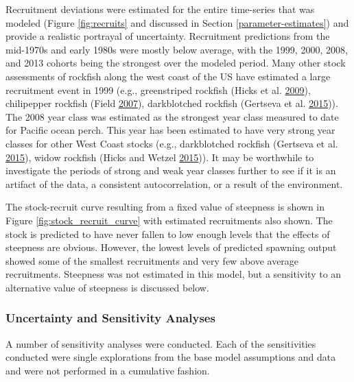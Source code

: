 \documentclass[12pt,]{article}
\begin{document}
Recruitment deviations were estimated for the entire time-series that
was modeled (Figure \ref{fig:recruits} and discussed in Section
\ref{parameter-estimates}) and provide a realistic portrayal of
uncertainty. Recruitment predictions from the mid-1970s and early 1980s
were mostly below average, with the 1999, 2000, 2008, and 2013 cohorts
being the strongest over the modeled period. Many other stock
assessments of rockfish along the west coast of the US have estimated a
large recruitment event in 1999 (e.g., greenstriped rockfish (Hicks et
al. \protect\hyperlink{ref-hicks_status_2009}{2009}), chilipepper
rockfish (Field \protect\hyperlink{ref-field_status_2007}{2007}),
darkblotched rockfish (Gertseva et al.
\protect\hyperlink{ref-gertseva_status_2015}{2015})). The 2008 year
class was estimated as the strongest year class measured to date for
Pacific ocean perch. This year has been estimated to have very strong
year classes for other West Coast stocks (e.g., darkblotched rockfish
(Gertseva et al. \protect\hyperlink{ref-gertseva_status_2015}{2015}),
widow rockfish (Hicks and Wetzel
\protect\hyperlink{ref-hicks_status_2015}{2015})). It may be worthwhile
to investigate the periods of strong and weak year classes further to
see if it is an artifact of the data, a consistent autocorrelation, or a
result of the environment.

The stock-recruit curve resulting from a fixed value of steepness is
shown in Figure \ref{fig:stock_recruit_curve} with estimated
recruitments also shown. The stock is predicted to have never fallen to
low enough levels that the effects of steepness are obvious. However,
the lowest levels of predicted spawning output showed some of the
smallest recruitments and very few above average recruitments. Steepness
was not estimated in this model, but a sensitivity to an alternative
value of steepness is discussed below.

\subsubsection{Uncertainty and Sensitivity
Analyses}\label{uncertainty-and-sensitivity-analyses}

A number of sensitivity analyses were conducted. Each of the
sensitivities conducted were single explorations from the base model
assumptions and data and were not performed in a cumulative fashion.
\end{document}
